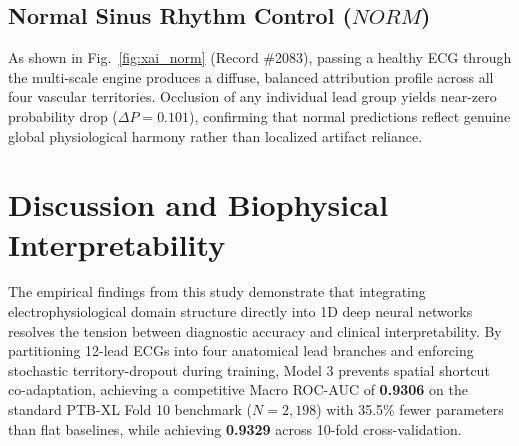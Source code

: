 \documentclass[12pt]{elsarticle}
\begin{document}
\subsection{Normal Sinus Rhythm Control ($NORM$)}
As shown in Fig.~\ref{fig:xai_norm} (Record \#2083), passing a healthy ECG through the multi-scale engine produces a diffuse, balanced attribution profile across all four vascular territories. Occlusion of any individual lead group yields near-zero probability drop ($\Delta P = 0.101$), confirming that normal predictions reflect genuine global physiological harmony rather than localized artifact reliance.

\section{Discussion and Biophysical Interpretability}
\label{sec:discussion}

The empirical findings from this study demonstrate that integrating electrophysiological domain structure directly into 1D deep neural networks resolves the tension between diagnostic accuracy and clinical interpretability. By partitioning 12-lead ECGs into four anatomical lead branches and enforcing stochastic territory-dropout during training, Model 3 prevents spatial shortcut co-adaptation, achieving a competitive Macro ROC-AUC of \textbf{0.9306} on the standard PTB-XL Fold 10 benchmark ($N = 2,198$) with 35.5\% fewer parameters than flat baselines, while achieving \textbf{0.9329} across 10-fold cross-validation.
\end{document}
